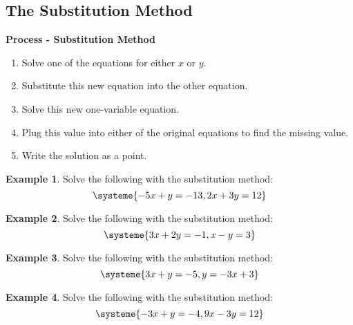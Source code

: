 \documentclass[addpoints,12pt]{exam}
\theoremstyle{definition}
\theoremstyle{break}
\theoremstyle{break}
\newtheorem{example}{Example}[subsection]
\begin{document}
\setcounter{section}{4}
\setcounter{subsection}{1}

\subsection{The Substitution Method}

\vspace{.15in}

\begin{mdframed}
\textbf{Process - Substitution Method}
\begin{enumerate}
\item Solve one of the equations for either $x$ or $y$.
\item Substitute this new equation into the other equation.
\item Solve this new one-variable equation.
\item Plug this value into either of the original equations to find the missing value.
\item Write the solution as a point.
\end{enumerate}
\end{mdframed}

\vspace{.15in}

\begin{example}
Solve the following with the substitution method:
\[\systeme{-5x + y = -13, 2x + 3y = 12}\]
\vspace{2in}
\end{example}

\newpage

\begin{example}
Solve the following with the substitution method:
\[\systeme{3x + 2y = -1, x - y = 3}\]
\vspace{3in}
\end{example}

\begin{example}
Solve the following with the substitution method:
\[\systeme{3x + y = -5, y = -3x + 3}\]
\end{example}

\newpage

\begin{example}
Solve the following with the substitution method:
\[\systeme{-3x + y = -4, 9x - 3y = 12}\]
\end{example}
\newpage 
\end{document}

